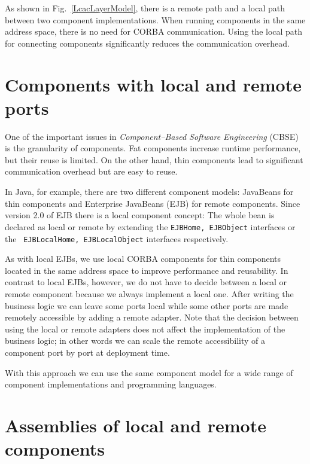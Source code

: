 As shown in Fig.~\ref{LcacLayerModel}, there is a remote path and a local path
between two component implementations. When running components in the same
address space, there is no need for CORBA communication. Using the local path
for connecting components significantly reduces the communication overhead.


\section{Components with local and remote ports}

One of the important issues in {\it Component--Based Software Engineering}
(CBSE) \cite{CBSE2001} is the granularity of components. Fat components increase
runtime performance, but their reuse is limited. On the other hand, thin
components lead to significant communication overhead but are easy to reuse.

In Java, for example, there are two different component models: JavaBeans
\cite{Englander1997} for thin components and Enterprise JavaBeans (EJB)
\cite{EJBSpecificationV2_0} for remote components. Since version 2.0 of EJB
there is a local component concept: The whole bean is declared as local or
remote by extending the {\tt EJBHome, EJBObject} interfaces or the {\tt
EJBLocalHome, EJBLocalObject} interfaces respectively.

As with local EJBs, we use local CORBA components for thin components located in
the same address space to improve performance and reusability. In contrast to
local EJBs, however, we do not have to decide between a local or remote
component because we always implement a local one. After writing the business
logic we can leave some ports local while some other ports are made remotely
accessible by adding a remote adapter. Note that the decision between using the
local or remote adapters does not affect the implementation of the business
logic; in other words we can scale the remote accessibility of a component port
by port at deployment time.

With this approach we can use the same component model for a wide range of
component implementations and programming languages.

\section{Assemblies of local and remote components}

